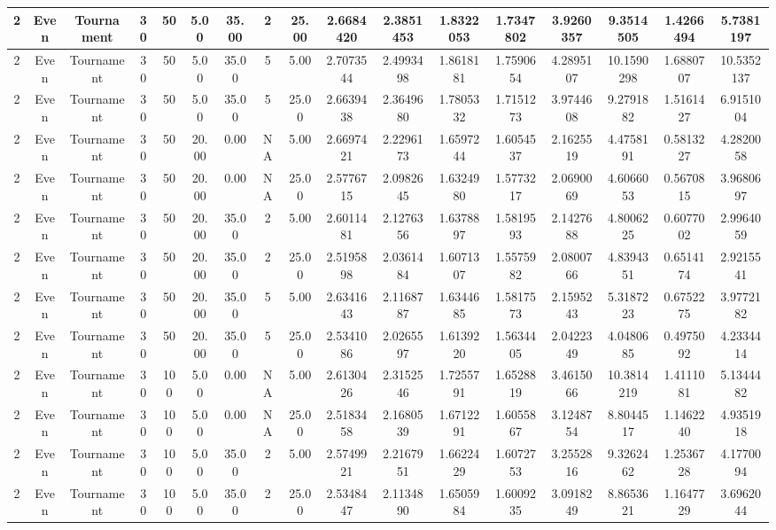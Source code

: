 \begin{longtable}{ | c | c | c | c | c | c | c | c | c | c | c | c | c | c | c | c | c | }
	\hline
	2	&	Even	&	Tournament	&	30	&	50	&	5.00	&	35.00	&	2	&	25.00	&	2.6684420	&	2.3851453	&	1.8322053	&	1.7347802	&	3.9260357	&	9.3514505	&	1.4266494	&	5.7381197 \\
	\hline
	2	&	Even	&	Tournament	&	30	&	50	&	5.00	&	35.00	&	5	&	5.00	&	2.7073544	&	2.4993498	&	1.8618181	&	1.7590654	&	4.2895107	&	10.1590298	&	1.6880707	&	10.5352137 \\
	\hline
	2	&	Even	&	Tournament	&	30	&	50	&	5.00	&	35.00	&	5	&	25.00	&	2.6639438	&	2.3649680	&	1.7805332	&	1.7151273	&	3.9744608	&	9.2791882	&	1.5161427	&	6.9151004 \\
	\hline
	2	&	Even	&	Tournament	&	30	&	50	&	20.00	&	0.00	&	NA	&	5.00	&	2.6697421	&	2.2296173	&	1.6597244	&	1.6054537	&	2.1625519	&	4.4758191	&	0.5813227	&	4.2820058 \\
	\hline
	2	&	Even	&	Tournament	&	30	&	50	&	20.00	&	0.00	&	NA	&	25.00	&	2.5776715	&	2.0982645	&	1.6324980	&	1.5773217	&	2.0690069	&	4.6066053	&	0.5670815	&	3.9680697 \\
	\hline
	2	&	Even	&	Tournament	&	30	&	50	&	20.00	&	35.00	&	2	&	5.00	&	2.6011481	&	2.1276356	&	1.6378897	&	1.5819593	&	2.1427688	&	4.8006225	&	0.6077002	&	2.9964059 \\
	\hline
	2	&	Even	&	Tournament	&	30	&	50	&	20.00	&	35.00	&	2	&	25.00	&	2.5195898	&	2.0361484	&	1.6071307	&	1.5575982	&	2.0800766	&	4.8394351	&	0.6514174	&	2.9215541 \\
	\hline
	2	&	Even	&	Tournament	&	30	&	50	&	20.00	&	35.00	&	5	&	5.00	&	2.6341643	&	2.1168787	&	1.6344685	&	1.5817573	&	2.1595243	&	5.3187223	&	0.6752275	&	3.9772182 \\
	\hline
	2	&	Even	&	Tournament	&	30	&	50	&	20.00	&	35.00	&	5	&	25.00	&	2.5341086	&	2.0265597	&	1.6139220	&	1.5634405	&	2.0422349	&	4.0480685	&	0.4975092	&	4.2334414 \\
	\hline
	2	&	Even	&	Tournament	&	30	&	100	&	5.00	&	0.00	&	NA	&	5.00	&	2.6130426	&	2.3152546	&	1.7255791	&	1.6528819	&	3.4615066	&	10.3814219	&	1.4111081	&	5.1344482 \\
	\hline
	2	&	Even	&	Tournament	&	30	&	100	&	5.00	&	0.00	&	NA	&	25.00	&	2.5183458	&	2.1680539	&	1.6712291	&	1.6055867	&	3.1248754	&	8.8044517	&	1.1462240	&	4.9351918 \\
	\hline
	2	&	Even	&	Tournament	&	30	&	100	&	5.00	&	35.00	&	2	&	5.00	&	2.5749921	&	2.2167951	&	1.6622429	&	1.6072753	&	3.2552816	&	9.3262462	&	1.2536728	&	4.1770094 \\
	\hline
	2	&	Even	&	Tournament	&	30	&	100	&	5.00	&	35.00	&	2	&	25.00	&	2.5348447	&	2.1134890	&	1.6505984	&	1.6009235	&	3.0918249	&	8.8653621	&	1.1647729	&	3.6962044 \\

\end{longtable}
